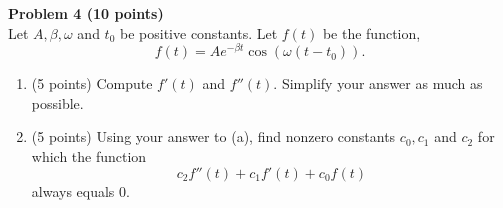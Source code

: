 \documentclass{article}
\begin{document}
\textbf{Problem 4 (10 points)} \\
Let \( A, \beta, \omega \) and \( t_0 \) be positive constants. Let \( f(t) \) be the function, 
\[
f(t) = Ae^{-\beta t} \cos(\omega (t - t_0)).
\]
\begin{enumerate}[label=(\alph*)]
    \item (5 points) Compute \( f'(t) \) and \( f''(t) \). Simplify your answer as much as possible.
    \item (5 points) Using your answer to (a), find nonzero constants \( c_0, c_1 \) and \( c_2 \) for which the function 
    \[
    c_2 f''(t) + c_1 f'(t) + c_0 f(t) 
    \]
    always equals 0.
\end{enumerate}
\end{document}
